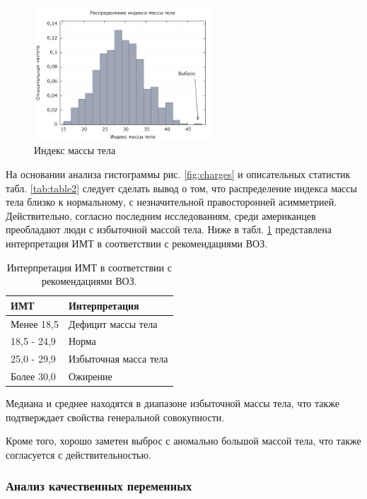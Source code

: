 \documentclass[a4paper,12pt]{article}
\begin{document}
\begin{figure}[H]
	\includegraphics[width=0.6\textwidth]{../[graphics]/bmi.png}
	\centering
	\caption{Индекс массы тела}
	\label{fig:bmi}
\end{figure}

На основании анализа гистограммы рис. \ref{fig:charges} и описательных статистик табл. \ref{tab:table2} следует сделать вывод о том, что распределение индекса массы тела близко к нормальному, с незначительной правосторонней асимметрией. Действительно, согласно последним исследованиям, среди американцев преобладают люди с избыточной массой тела. Ниже в табл. \ref{tab:bmi} представлена интерпретация ИМТ в соответствии с рекомендациями ВОЗ.

\begin{table}[H]
	\begin{center}
		\begin{tabular}{ | l | l |}
			\hline
			ИМТ & Интерпретация \\ \hline
			Менее 18,5 & Дефицит массы тела \\ \hline
			18,5 - 24,9 & Норма \\ \hline
			25,0 - 29,9 & Избыточная масса тела \\ \hline
			Более 30,0 & Ожирение \\ \hline
		\end{tabular}
	\end{center}
	\caption{Интерпретация ИМТ в соответствии с рекомендациями ВОЗ.}
	\label{tab:bmi}
\end{table}

Медиана и среднее находятся в диапазоне избыточной массы тела, что также подтверждает свойства генеральной совокупности.

Кроме того, хорошо заметен выброс с аномально большой массой тела, что также согласуется с действительностью.

\subsubsection{Анализ качественных переменных}
\end{document}
